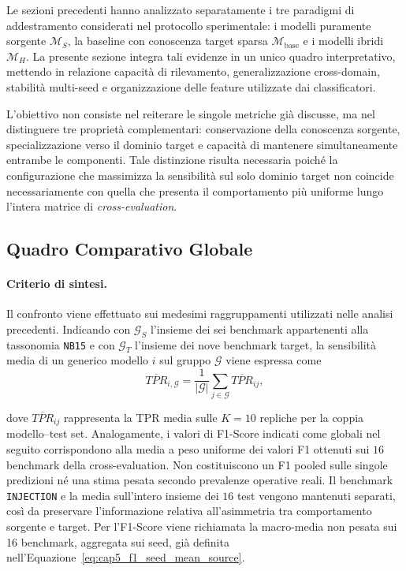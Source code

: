 Le sezioni precedenti hanno analizzato separatamente i tre paradigmi di addestramento considerati nel protocollo sperimentale: i modelli puramente sorgente $\mathcal{M}_{S}$, la baseline con conoscenza target sparsa $\mathcal{M}_{\mathrm{base}}$ e i modelli ibridi $\mathcal{M}_{H}$.
La presente sezione integra tali evidenze in un unico quadro interpretativo, mettendo in relazione capacità di rilevamento, generalizzazione cross-domain, stabilità multi-seed e organizzazione delle feature utilizzate dai classificatori.

L'obiettivo non consiste nel reiterare le singole metriche già discusse, ma nel distinguere tre proprietà complementari: conservazione della conoscenza sorgente, specializzazione verso il dominio target e capacità di mantenere simultaneamente entrambe le componenti. 
Tale distinzione risulta necessaria poiché la configurazione che massimizza la sensibilità sul solo dominio target non coincide necessariamente con quella che presenta il comportamento più uniforme lungo l'intera matrice di \textit{cross-evaluation}.



\subsection{Quadro Comparativo Globale}
\label{subsec:quadro_comparativo_globale}

\paragraph{Criterio di sintesi.}
Il confronto viene effettuato sui medesimi raggruppamenti utilizzati nelle analisi precedenti. 
Indicando con $\mathcal{G}_{S}$ l'insieme dei sei benchmark appartenenti alla tassonomia \texttt{NB15} e con $\mathcal{G}_{T}$ l'insieme dei nove benchmark target, la sensibilità media di un generico modello $i$ sul gruppo $\mathcal{G}$ viene espressa come
\begin{equation}
    \overline{TPR}_{i,\mathcal{G}}
    =
    \frac{1}{|\mathcal{G}|}
    \sum_{j\in\mathcal{G}}
    \overline{TPR}_{ij},
    \label{eq:cap5_global_group_tpr}
\end{equation}

dove $\overline{TPR}_{ij}$ rappresenta la TPR media sulle $K=10$ repliche per la coppia modello--test set. 
Analogamente, i valori di F1-Score indicati come globali nel seguito corrispondono alla media a peso uniforme dei valori F1 ottenuti sui $16$ benchmark della cross-evaluation. Non costituiscono un F1 pooled sulle singole predizioni né una stima pesata secondo prevalenze operative reali.
Il benchmark \texttt{INJECTION} e la media sull'intero insieme dei $16$ test vengono mantenuti separati, così da preservare l'informazione relativa all'asimmetria tra comportamento sorgente e target. 
Per l'F1-Score viene richiamata la macro-media non pesata sui 16 benchmark, aggregata sui seed, già definita nell'Equazione~\eqref{eq:cap5_f1_seed_mean_source}.

